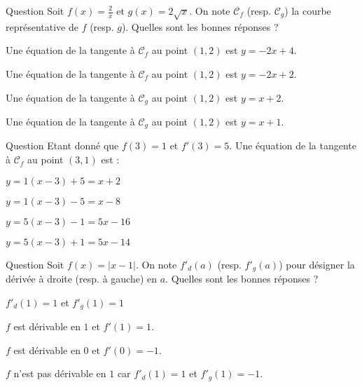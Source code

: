 

\begin{multi}[multiple,feedback=
{Une équation de la tangente à \(\mathcal{C}_f\) au point \((a,f(a))\) est : 
\[y=f'(a)(x-a)+f(a).\]
Ici, \(\displaystyle f'(x)=-\frac{2}{x^2}\) et \(\displaystyle g'(x)=\frac{1}{\sqrt{x}}\).
}]{Question}
Soit \(\displaystyle f(x)=\frac{2}{x}\) et \(g(x)=2\sqrt{x}\). On note \(\mathcal{C}_f\) (resp. \(\mathcal{C}_g\)) la courbe représentative de \(f\) (resp. \(g\)). Quelles sont les bonnes réponses ?

    \item* Une équation de la tangente à \(\mathcal{C}_f\) au point \((1,2)\) est \(y=-2x+4\).
    \item Une équation de la tangente à \(\mathcal{C}_f\) au point \((1,2)\) est \(y=-2x+2\).
    \item Une équation de la tangente à \(\mathcal{C}_g\) au point \((1,2)\) est \(y=x+2\).
    \item* Une équation de la tangente à \(\mathcal{C}_g\) au point \((1,2)\) est \(y=x+1\).
\end{multi}


\begin{multi}[multiple,feedback=
{On applique la formule du cours \(\displaystyle y=f'(3)(x-3)+f(3)=5(x-3)+1\).
}]{Question}
Etant donné que \(\displaystyle f(3)=1\) et \(f'(3)=5\). Une équation de la tangente à \(\mathcal{C}_f\) au point \((3,1)\) est :

    \item \(y=1(x-3)+5=x+2\)
    \item \(y=1(x-3)-5=x-8\)
    \item \(y=5(x-3)-1=5x-16\)
    \item* \(y=5(x-3)+1=5x-14\)
\end{multi}


\begin{multi}[multiple,feedback=
{Par définition, on a :
\[f(x)=\left\{ \begin{array}{ll}x-1&\mbox{si }x\geq 1\\ 1-x&\mbox{si }x\leq 1.
\end{array}\right.\]
Donc, \(f\) est dérivable sur \(\Rr\setminus\{1\}\), et
\[f'(x)=\left\{ \begin{array}{ll}1&\mbox{si }x> 1\\ -1&\mbox{si }x< 1.
\end{array}\right.\]
En particulier, \(f'(0)=-1\). Par contre \(f\) n'est pas dérivable en \(1\) car
\[\lim _{x\to 1^+}\frac{f(x)-f(1)}{x-1}=1 \mbox{ et }\lim _{x\to 1^-}\frac{f(x)-f(1)}{x-1}=-1.\]
}]{Question}
Soit \(\displaystyle f(x)=|x-1|\). On note \(f'_d(a)\) (resp. \(f'_g(a)\)) pour désigner la dérivée à droite (resp. à gauche) en \(a\). Quelles sont les bonnes réponses ?

    \item \(f'_d(1)=1\) et \(f'_g(1)=1\)
    \item \(f\) est dérivable en \(1\) et \(f'(1)=1\).
    \item* \(f\) est dérivable en \(0\) et \(f'(0)=-1\).
    \item* \(f\) n'est pas dérivable en \(1\) car \(f'_d(1)=1\) et \(f'_g(1)=-1\).
\end{multi}


